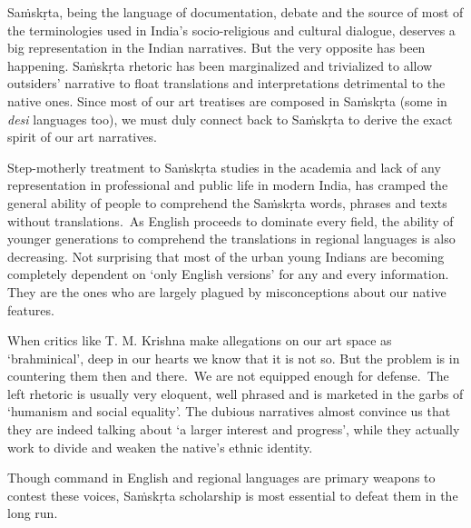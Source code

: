 \vspace{-.2cm}

Saṁskṛta, being the language of documentation, debate and the source of most of the terminologies used in India’s socio-religious and cultural dialogue, deserves a big representation in the Indian narratives. But the very opposite has been happening. Saṁskṛta rhetoric has been marginalized and trivialized to allow outsiders’ narrative to float translations and interpretations detrimental to the native ones. Since most of our art treatises are composed in Saṁskṛta (some in \textit{desi} languages too), we must duly connect back to Saṁskṛta to derive the exact spirit of our art narratives.

Step-motherly treatment to Saṁskṛta studies in the academia and lack of any representation in professional and public life in modern India, has cramped the general ability of people to comprehend the Saṁskṛta words, phrases and texts without translations.~As English proceeds to dominate every field, the ability of younger generations to comprehend the translations in regional languages is also decreasing. Not surprising that most of the urban young Indians are becoming completely dependent on ‘only English versions’ for any and every information. They are the ones who are largely plagued by misconceptions about our native features.

When critics like T. M. Krishna make allegations on our art space as ‘brahminical’, deep in our hearts we know that it is not so. But the problem is in countering them then and there.~We are not equipped enough for defense.~The left rhetoric is usually very eloquent, well phrased and is marketed in the garbs of ‘humanism and social equality’. The dubious narratives almost convince us that they are indeed talking about ‘a larger interest and progress’, while they actually work to divide and weaken the native’s ethnic identity.

Though command in English and regional languages are primary weapons to contest these voices, Saṁskṛta scholarship is most essential to defeat them in the long run.

